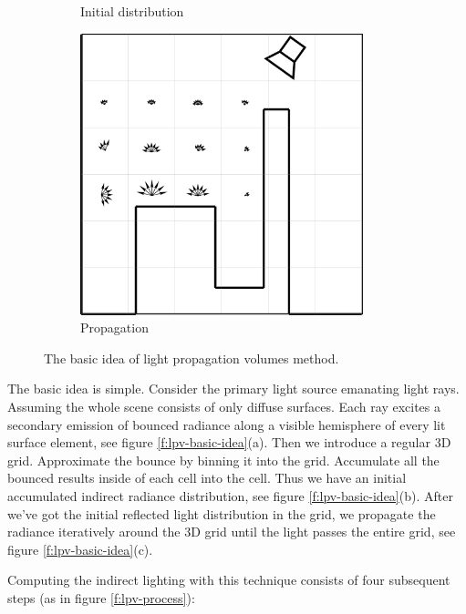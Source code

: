 \begin{figure}
\begin{subfigure}[b]{0.32\textwidth}
	\caption{Initial distribution}
\end{subfigure}
\begin{subfigure}[b]{0.32\textwidth}
	\includegraphics[width=0.9\textwidth]{graphics/lpv/lpv-2-3}
	\caption{Propagation}
\end{subfigure}
\caption{The basic idea of light propagation volumes method.}
\end{figure}

The basic idea is simple. Consider the primary light source emanating light rays. Assuming the whole scene consists of only diffuse surfaces. Each ray excites a secondary emission of bounced radiance along a visible hemisphere of every lit surface element, see figure \ref{f:lpv-basic-idea}(a). Then we introduce a regular 3D grid. Approximate the bounce by binning it into the grid. Accumulate all the bounced results inside of each cell into the cell. Thus we have an initial accumulated indirect radiance distribution, see figure \ref{f:lpv-basic-idea}(b). After we've got the initial reflected light distribution in the grid, we propagate the radiance iteratively around the 3D grid until the light passes the entire grid, see figure \ref{f:lpv-basic-idea}(c).

Computing the indirect lighting with this technique consists of four subsequent steps (as in figure \ref{f:lpv-process}):


